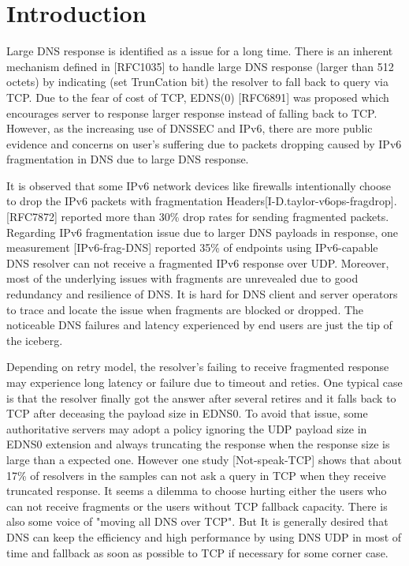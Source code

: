 \section{Introduction}
Large DNS response is identified as a issue for a long time.  There
is an inherent mechanism defined in [RFC1035] to handle large DNS
response (larger than 512 octets) by indicating (set TrunCation bit)
the resolver to fall back to query via TCP.  Due to the fear of cost
of TCP, EDNS(0) [RFC6891] was proposed which encourages server to
response larger response instead of falling back to TCP.  However, as
the increasing use of DNSSEC and IPv6, there are more public evidence
and concerns on user's suffering due to packets dropping caused by
IPv6 fragmentation in DNS due to large DNS response.

It is observed that some IPv6 network devices like firewalls
intentionally choose to drop the IPv6 packets with fragmentation
Headers[I-D.taylor-v6ops-fragdrop].  [RFC7872] reported more than 30\%
drop rates for sending fragmented packets.  Regarding IPv6
fragmentation issue due to larger DNS payloads in response, one
measurement [IPv6-frag-DNS] reported 35\% of endpoints using
IPv6-capable DNS resolver can not receive a fragmented IPv6 response
over UDP.  Moreover, most of the underlying issues with fragments are
unrevealed due to good redundancy and resilience of DNS.  It is hard
for DNS client and server operators to trace and locate the issue
when fragments are blocked or dropped.  The noticeable DNS failures
and latency experienced by end users are just the tip of the iceberg.

Depending on retry model, the resolver's failing to receive
fragmented response may experience long latency or failure due to
timeout and reties.  One typical case is that the resolver finally
got the answer after several retires and it falls back to TCP after
deceasing the payload size in EDNS0.  To avoid that issue, some
authoritative servers may adopt a policy ignoring the UDP payload
size in EDNS0 extension and always truncating the response when the
response size is large than a expected one.  However one study
[Not-speak-TCP] shows that about 17\% of resolvers in the samples can
not ask a query in TCP when they receive truncated response.  It
seems a dilemma to choose hurting either the users who can not
receive fragments or the users without TCP fallback capacity.  There
is also some voice of "moving all DNS over TCP".  But It is generally
desired that DNS can keep the efficiency and high performance by
using DNS UDP in most of time and fallback as soon as possible to TCP
if necessary for some corner case.

